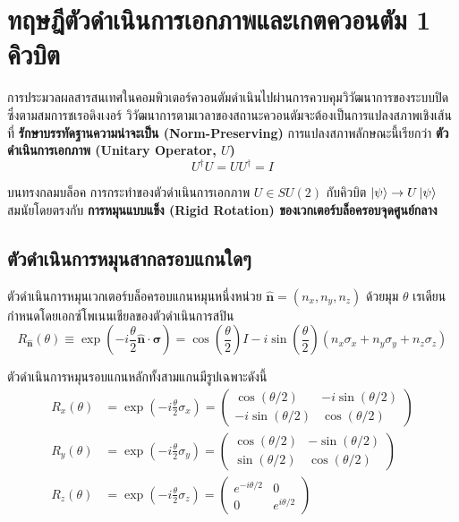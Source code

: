 \section{ทฤษฎีตัวดำเนินการเอกภาพและเกตควอนตัม 1 คิวบิต}

การประมวลผลสารสนเทศในคอมพิวเตอร์ควอนตัมดำเนินไปผ่านการควบคุมวิวัฒนาการของระบบปิด ซึ่งตามสมการชเรอดิงเงอร์ วิวัฒนาการตามเวลาของสถานะควอนตัมจะต้องเป็นการแปลงสภาพเชิงเส้นที่ \textbf{รักษาบรรทัดฐานความน่าจะเป็น (Norm-Preserving)} การแปลงสภาพลักษณะนี้เรียกว่า \textbf{ตัวดำเนินการเอกภาพ (Unitary Operator, $U$)}
\begin{equation}
U^\dagger U = U U^\dagger = I
\end{equation}

บนทรงกลมบล็อค การกระทำของตัวดำเนินการเอกภาพ $U \in SU(2)$ กับคิวบิต $\ket{\psi} \to U\ket{\psi}$ สมนัยโดยตรงกับ \textbf{การหมุนแบบแข็ง (Rigid Rotation) ของเวกเตอร์บล็อครอบจุดศูนย์กลาง}

\subsection{ตัวดำเนินการหมุนสากลรอบแกนใดๆ}
ตัวดำเนินการหมุนเวกเตอร์บล็อครอบแกนหมุนหนึ่งหน่วย $\hat{\mathbf{n}} = (n_x, n_y, n_z)$ ด้วยมุม $\theta$ เรเดียน กำหนดโดยเอกซ์โพเนนเชียลของตัวดำเนินการสปิน
\begin{equation}
R_{\hat{\mathbf{n}}}(\theta) \equiv \exp\left( -i\frac{\theta}{2} \hat{\mathbf{n}}\cdot\boldsymbol{\sigma} \right) = \cos\left(\frac{\theta}{2}\right) I - i\sin\left(\frac{\theta}{2}\right) (n_x \sigma_x + n_y \sigma_y + n_z \sigma_z)
\label{eq:arbitrary_rotation_gate}
\end{equation}

ตัวดำเนินการหมุนรอบแกนหลักทั้งสามแกนมีรูปเฉพาะดังนี้
\begin{align}
R_x(\theta) &= \exp\left( -i\frac{\theta}{2}\sigma_x \right) = \begin{pmatrix} \cos(\theta/2) & -i\sin(\theta/2) \\ -i\sin(\theta/2) & \cos(\theta/2) \end{pmatrix} \label{eq:rx_gate} \\
R_y(\theta) &= \exp\left( -i\frac{\theta}{2}\sigma_y \right) = \begin{pmatrix} \cos(\theta/2) & -\sin(\theta/2) \\ \sin(\theta/2) & \cos(\theta/2) \end{pmatrix} \label{eq:ry_gate} \\
R_z(\theta) &= \exp\left( -i\frac{\theta}{2}\sigma_z \right) = \begin{pmatrix} e^{-i\theta/2} & 0 \\ 0 & e^{i\theta/2} \end{pmatrix} \label{eq:rz_gate}
\end{align}

